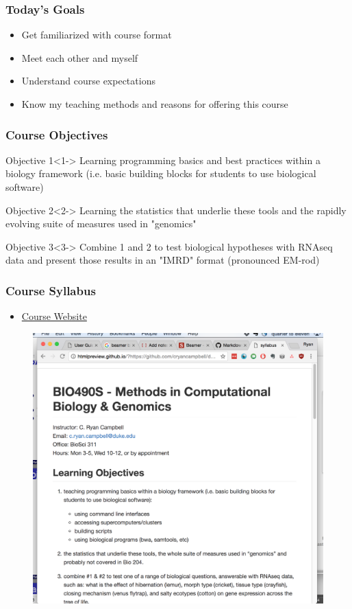 \documentclass[14pt]{beamer}
\begin{document}
\begin{frame}
\frametitle{Today's Goals}
\begin{itemize}
\item Get familiarized with course format
\item Meet each other and myself
\item Understand course expectations
\item Know my teaching methods and reasons for offering this course
\end{itemize}


\end{frame}
\begin{frame}
\frametitle{Course Objectives}
\small
\begin{block}{Objective 1}<1->
Learning programming basics and best practices within a biology framework (i.e. basic building blocks for students to use biological software)
\end{block}

\begin{block}{Objective 2}<2->
Learning the statistics that underlie these tools and the rapidly evolving suite of measures used in "genomics"
\end{block}

\begin{block}{Objective 3}<3->
Combine 1 and 2 to test biological hypotheses with RNAseq data and present those results in an "IMRD" format (pronounced EM-rod)
\end{block}
\normalsize

\end{frame}
\begin{frame}
\frametitle{Course Syllabus}
\begin{itemize}
	\item \href{https://goo.gl/forms/fnCaNIcwQiNiawcv1}{Course Website}
\end{itemize}
\begin{figure}
\includegraphics[width=0.6\linewidth]{images_20170829_syllabus.png}
\end{figure}
\end{frame}
\end{document}
